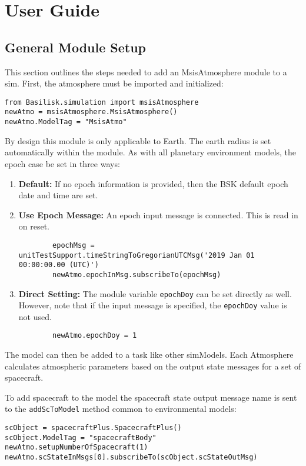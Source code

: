 
\section{User Guide}

\subsection{General Module Setup}
This section outlines the steps needed to add an MsisAtmosphere module to a sim.
First, the atmosphere must be imported and initialized:
\begin{verbatim}
from Basilisk.simulation import msisAtmosphere
newAtmo = msisAtmosphere.MsisAtmosphere()
newAtmo.ModelTag = "MsisAtmo"
\end{verbatim}

By design this module is only applicable to Earth.  The earth radius is set automatically within the module.  As with all planetary environment models, the epoch case be set in three ways:
\begin{enumerate}
	\item  {\bfseries Default:} If no epoch information is provided, then the BSK default epoch date and time are set.
	\item  {\bfseries Use Epoch Message:}  An epoch input message  is connected.  This is read in on reset.
	\begin{verbatim}
		epochMsg = unitTestSupport.timeStringToGregorianUTCMsg('2019 Jan 01 00:00:00.00 (UTC)')
		newAtmo.epochInMsg.subscribeTo(epochMsg)
	\end{verbatim}
	\item  {\bfseries Direct Setting:} The module variable {\tt epochDoy} can be set directly as well.  However, note that if the input message is specified, the {\tt epochDoy} value is not used.
	\begin{verbatim}
		newAtmo.epochDoy = 1
	\end{verbatim}	
\end{enumerate}

The model can then be added to a task like other simModels. Each Atmosphere calculates atmospheric parameters based on the output state messages for a set of spacecraft.

To add spacecraft to the model the spacecraft state output message name is sent to the \verb|addScToModel| method common to environmental models:
\begin{verbatim}
scObject = spacecraftPlus.SpacecraftPlus()
scObject.ModelTag = "spacecraftBody"
newAtmo.setupNumberOfSpacecraft(1)
newAtmo.scStateInMsgs[0].subscribeTo(scObject.scStateOutMsg)
\end{verbatim}

